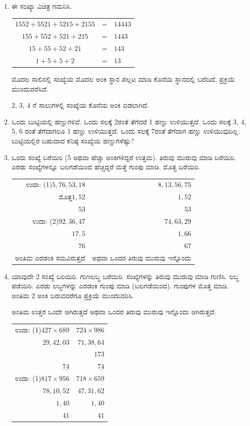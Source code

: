 \begin{enumerate}
\item ಈ ಸಂಖ್ಯಾ ವಿಚಿತ್ರ ಗಮನಿಸಿ. 

\begin{tabular}[t]{c@{\;}c@{\;}l}
$1552+5521+5215+2155$ & = & $14443$\\
$155+552+521+215$ & = & $1443$\\
$15+55+52+21$ & = & $143$\\
$1+5+5+2$ & = & $13$ 
\end{tabular}

\vskip 0.1cm

ಮೊದಲ ಸಾಲಿನಲ್ಲಿ ಸಂಖ್ಯೆಯ ಮೊದಲ ಅಂಕಿ ಸ್ಥಾನ ಪಲ್ಲಟ ಮಾಡಿ ಕೊನೆಯ ಸ್ಥಾನದಲ್ಲಿ ಬರೆದಿದೆ. ಪ್ರಕ್ರಿಯೆ ಮುಂದುವರೆಸಿದೆ. 

2, 3, 4 ನೆ ಸಾಲುಗಳಲ್ಲಿ ಸಂಖ್ಯೆಯ ಕೊನೆಯ ಅಂಕಿ ಬಿಡಲಾಗಿದೆ. 

\item ಒಂದು ಬುಟ್ಟಿಯಲ್ಲಿ ಹಣ್ಣುಗಳಿವೆ. ಒಂದು ಸಲಕ್ಕೆ 2ರಂತೆ ತೆಗೆದರೆ 1 ಹಣ್ಣು ಉಳಿಯುತ್ತದೆ. ಒಂದು ಸಲಕ್ಕೆ 3, 4, 5, 6 ರಂತೆ ತೆಗೆದಾಗಲೂ 1 ಹಣ್ಣು ಉಳಿಯುತ್ತದೆ. ಒಂದು ಸಲಕ್ಕೆ 7ರಂತೆ ತೆಗೆದಾಗ ಹಣ್ಣು ಉಳಿಯುವುದಿಲ್ಲ. ಬುಟ್ಟಿಯಲ್ಲಿರ ಬಹುದಾದ ಕನಿಷ್ಠ ಸಂಖ್ಯೆಯ ಹಣ್ಣುಗಳೆಷ್ಟು? 

\item ಒಂದು ಸಂಖ್ಯೆ ಬರೆಯಿರಿ (5 ಅಥವಾ ಹೆಚ್ಚು ಅಂಕಿಗಳಿದ್ದರೆ ಉತ್ತಮ). ತಿರುವು ಮುರುವು ಮಾಡಿ ಬರೆಯಿರಿ. ಎರಡು ಸಂಖ್ಯೆಗಳನ್ನೂ ಬಲಗಡೆಯಿಂದ ಹೆಚ್ಚಿದ್ದರೆ ಮತ್ತೆ ಗುಂಪು ಮಾಡಿ. ಮೊತ್ತ ಬರೆಯಿರಿ. 

{\fontsize{12pt}{14pt}\selectfont
\begin{tabular}[t]{rr}
ಉದಾ: (1)\quad  $5,76,53,18$ & $8,13,56,75$\\
ಮೊತ್ತ\quad $1,52$ & $1,52$\\
$\underline{53}$ & $\underline{53}$\\
ಉದಾ: (2)\quad $92,36,47$  & $74,63,29$\\
$17,5$ & $1,66$\\
$76$ & $67$\\
ಅಂತಿಮ ಎರಡಂಕಿ ಸಮವಿರುತ್ತದೆ  & ಅಥವಾ ಒಂದರ ತಿರುವು ಮುರುವು ಇನ್ನೊಂದು 
\end{tabular}}\relax

\eject

\item ಯಾವುದೇ 2 ಸಂಖ್ಯೆ ಬರಿಯಿರಿ. ಗುಣಲಬ್ಧ ಬರೆಯಿರಿ. ಸಂಖ್ಯೆಗಳನ್ನು ತಿರುವು ಮುರುವು ಮಾಡಿ ಗುಣಿಸಿ. ಲಬ್ಧ ಪಡೆಯಿರಿ. ಎರಡು ಲಬ್ಧಗಳನ್ನು ಎರಡಂಕಿ ಗುಂಪು ಮಾಡಿ (ಬಲಗಡೆಯಿಂದ). ಗುಂಪುಗಳ ಮೊತ್ತ ಮಾಡಿ. ಅಂತಿಮ 2 ಅಂಕಿ ಬರುವವರೆಗೂ ಪ್ರಕ್ರಿಯೆ ಮುಂದುವರಿಸಿ. 

ಅಂತಿಮ ಉತ್ತರ ಒಂದೇ ಆಗಿರುತ್ತದೆ ಅಥವಾ ಒಂದರ ತಿರುವು ಮುರುವು ಇನ್ನೊಂದು ಆಗಿರುತ್ತದೆ. 

\begin{tabular}[t]{rr}
ಉದಾ: (1)\quad $427\times 689$ & $724\times 986$\\
$29,42,03$ & $71,38,64$\\
& $173$\\
$\underline{74}$ & $\underline{74}$\\
ಉದಾ: (1)\quad $817\times 956$ & $718\times 659$\\
$78,10,52$ & $47,31,62$\\
$1,40$ & $1,40$\\
$\underline{41}$ & $\underline{41}$
\end{tabular}
\end{enumerate}

